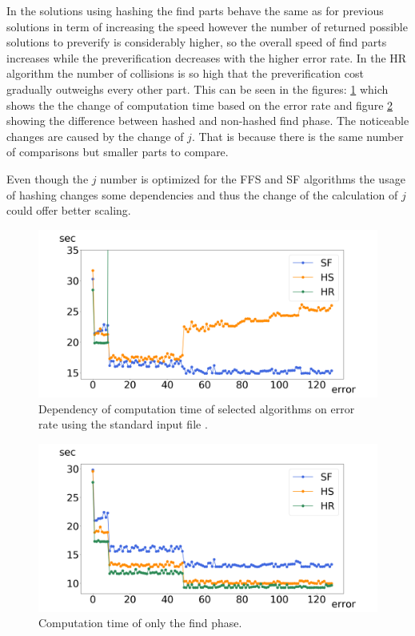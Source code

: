 In the solutions using hashing the find parts behave the same as for previous solutions in term of increasing the speed however the number of returned possible solutions to preverify is considerably higher, so the overall speed of find parts increases while the preverification decreases with the higher error rate. In the HR algorithm the number of collisions is so high that the preverification cost gradually outweighs every other part. This can be seen in the figures: \ref{fig_errA} which shows the the change of computation time based on the error rate and figure \ref{fig_errF} showing the difference between hashed and non-hashed find phase. The noticeable changes are caused by the change of $j$. That is because there is the same number of comparisons but smaller parts to compare.

Even though the $j$ number is optimized for the FFS and SF algorithms the usage of hashing changes some dependencies and thus the change of the calculation of $j$ could offer better scaling.

\begin{figure}
\centering
\includegraphics[width=\textwidth]{img/errorAll}
\caption{Dependency of computation time of selected algorithms on error rate using the standard input file .}
\label{fig_errA}
\end{figure}

\begin{figure}
\centering
\includegraphics[width=\textwidth]{img/errorFind}
\caption{Computation time of only the find phase.}
\label{fig_errF}
\end{figure}

